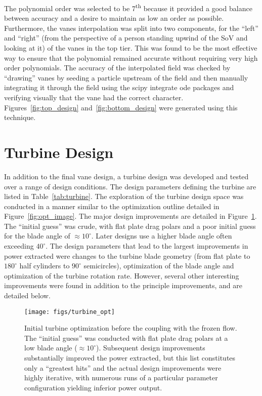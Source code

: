 The polynomial order was selected to be 7\textsuperscript{th} because it
provided a good balance between accuracy and a desire to maintain as low
an order as possible. Furthermore, the vanes interpolation was split
into two components, for the ``left'' and ``right'' (from the perspective of a
person standing upwind of the SoV and looking at it) of the vanes in the
top tier. This was found to be the most effective way to ensure that the
polynomial remained accurate without requiring very high order
polynomials. The accuracy of the interpolated field was checked by
``drawing'' vanes by seeding a particle upstream of the field and then
manually integrating it through the field using the scipy integrate ode
packages and verifying visually that the vane had the correct
character. Figures~\ref{fig:top_design} and~\ref{fig:bottom_design} were
generated using this technique. 

%
%

\section{Turbine Design}
\label{sec:turb_design}

In addition to the final vane design, a turbine design was developed and
tested over a range of design conditions. The design parameters defining
the turbine are listed in Table~\ref{tab:turbine}. The exploration of the
turbine design space was conducted in a manner similar to the
optimization outline detailed in Figure~\ref{fig:opt_image}. The major
design improvements are detailed in Figure~\ref{fig:ut_turbine}. The
``initial guess'' was crude, with flat plate drag polars and a poor
initial guess for the blade angle of $\approx 10^{\circ}$. Later
designs use a higher blade angle often exceeding $40^{\circ}$. 
The design parameters that lead to the largest improvements in power
extracted were changes to the turbine blade geometry (from flat plate to
$180^{\circ}$ half cylinders to $90^{\circ}$ semicircles), optimization
of the blade angle and optimization of the turbine rotation rate. 
However, several other interesting improvements were found in addition to the
principle improvements, and are detailed below. 

  \begin{figure}[!htb]
   \begin{center}
    \texttt{[image: figs/turbine\_opt]}
    \caption{Initial turbine optimization before the coupling with the
    frozen flow. The ``initial guess'' was conducted with flat plate
    drag polars at a low blade angle ($\approx
    10^{\circ}$). Subsequent design improvements substantially improved  
    the power extracted, but this list constitutes only a ``greatest
    hits'' and the actual design improvements were highly iterative,
    with numerous runs of a particular parameter configuration yielding
    inferior power output. }
    \label{fig:ut_turbine}
   \end{center}
  \end{figure}

